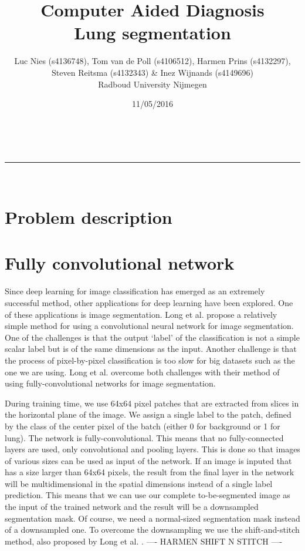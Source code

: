 \documentclass[a4paper,10pt]{article}
\makeatletter
\numberwithin{equation}{section} %
\numberwithin{figure}{section} %
\numberwithin{table}{section} %
\newcommand{\linia}{\rule{\linewidth}{0.5pt}}
\renewcommand{\maketitle}{
\begin{center}
\vspace{2ex}
{\huge \textsc{\@title}}
\vspace{1ex}
\\
\linia\\
\@author  \@date
\vspace{4ex}
\end{center}
}
\makeatother
\begin{document}
\title{Computer Aided Diagnosis \\\vspace{0.2cm} Lung segmentation}

\author{Luc Nies (s4136748), Tom van de Poll (s4106512), Harmen Prins (s4132297),\\ Steven Reitsma (s4132343) \& Inez Wijnands (s4149696)\\ Radboud University Nijmegen\\}

\date{11/05/2016}

\maketitle

\section{Problem description}

\section{Fully convolutional network}

Since deep learning for image classification has emerged as an extremely successful method, other applications for deep learning have been explored.
One of these applications is image segmentation.
Long et al. \cite{long2015fully} propose a relatively simple method for using a convolutional neural network for image segmentation.
One of the challenges is that the output `label' of the classification is not a simple scalar label but is of the same dimensions as the input.
Another challenge is that the process of pixel-by-pixel classification is too slow for big datasets such as the one we are using.
Long et al. \cite{long2015fully} overcome both challenges with their method of using fully-convolutional networks for image segmentation.

During training time, we use 64x64 pixel patches that are extracted from slices in the horizontal plane of the image.
We assign a single label to the patch, defined by the class of the center pixel of the batch (either 0 for background or 1 for lung).
The network is fully-convolutional. This means that no fully-connected layers are used, only convolutional and pooling layers.
This is done so that images of various sizes can be used as input of the network.
If an image is inputed that has a size larger than 64x64 pixels, the result from the final layer in the network will be multidimensional in the spatial dimensions instead of a single label prediction.
This means that we can use our complete to-be-segmented image as the input of the trained network and the result will be a downsampled segmentation mask.
Of course, we need a normal-sized segmentation mask instead of a downsampled one.
To overcome the downsampling we use the shift-and-stitch method, also proposed by Long et al. \cite{long2015fully}.
---- HARMEN SHIFT N STITCH ----
\end{document}
